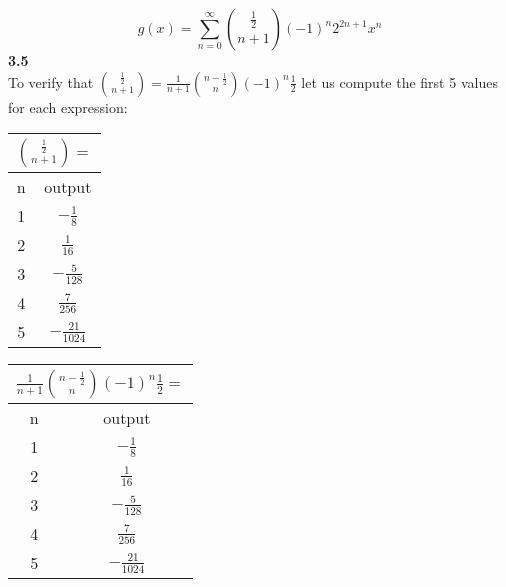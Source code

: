 \documentclass[10pt,a4paper]{report}
\begin{document}
	\[g(x) = \sum_{n=0}^{\infty}\binom{\frac{1}{2}}{n+1}(-1)^{n}2^{2n+1}x^n\]
	\textbf{3.5}\\
	To verify that $\binom{\frac{1}{2}}{n+1} = \frac{1}{n+1}\binom{n-\frac{1}{2}}{n}(-1)^n\frac{1}{2}$ let us compute the first 5 values for each expression:\\
	\begin{center}
		\begin{tabular}{|c|c|}
			\hline
			\multicolumn{2}{|c|}{$\binom{\frac{1}{2}}{n+1} = $} \\[.25cm]
			\hline
			n&output\\
			\hline
			1&$-\frac{1}{8}$\\[.25cm]
			\hline
			2&$\frac{1}{16}$\\[.25cm]
			\hline
			3&$-\frac{5}{128}$\\[.25cm]
			\hline
			4&$\frac{7}{256}$\\[.25cm]
			\hline
			5&$-\frac{21}{1024}$\\[.25cm]
			\hline
		\end{tabular}
		\hspace{2em}
		\begin{tabular}{|c|c|}
			\hline
			\multicolumn{2}{|c|}{$\frac{1}{n+1}\binom{n-\frac{1}{2}}{n}(-1)^n\frac{1}{2} = $} \\[.25cm]
			\hline
			n&output\\
			\hline
			1&$-\frac{1}{8}$\\[.25cm]
			\hline
			2&$\frac{1}{16}$\\[.25cm]
			\hline
			3&$-\frac{5}{128}$\\[.25cm]
			\hline
			4&$\frac{7}{256}$\\[.25cm]
			\hline
			5&$-\frac{21}{1024}$\\[.25cm]
			\hline
		\end{tabular}
	\end{center}
	
\end{document}
